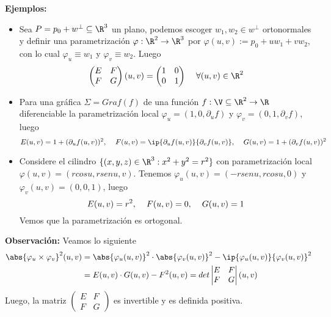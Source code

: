 \documentclass{article}
\begin{document}
\vspace{4mm}
\noindent\textbf{Ejemplos:}
\begin{itemize}
    \item Sea $P=p_{0}+w^{\perp}\subseteq\R^{3}$ un plano, podemos escoger $w_{1},w_{2}\in 
    w^{\perp}$ ortonormales y definir una parametrización $\varphi:\R^{2}\to\R^{3}$ por
    $\varphi(u,v):=p_{0}+uw_{1}+vw_{2}$, con lo cual $\varphi_{u}\equiv w_{1}$ y 
    $\varphi_{v}\equiv w_{2}$. Luego
    \begin{equation*}
        \begin{pmatrix}
            E & F \\
            F & G
        \end{pmatrix}(u,v)=
        \begin{pmatrix}
            1 & 0 \\
            0 & 1
        \end{pmatrix}\hspace{4mm}\forall(u,v)\in\R^{2}
    \end{equation*}

    \item Para una gráfica $\Sigma=Graf(f)$ de una función $f:\V\subseteq\R^{2}\to\R$ diferenciable
    la parametrización local $\varphi_{u}=(1,0,\partial_{u}f)$ y $\varphi_{v}=(0,1,\partial_{v}f)$,
    luego
    \begin{equation*}
        E(u,v)=1+(\partial_{u}f(u,v))^{2},\hspace{4mm}
        F(u,v)=\ip{\partial_{u}f(u,v)}{\partial_{v}f(u,v)},\hspace{4mm}
        G(u,v)=1+(\partial_{v}f(u,v))^{2}
    \end{equation*}

    \item Considere el cilindro $\{(x,y,z)\in\R^{3}:x^{2}+y^{2}=r^{2}\}$ con parametrización local
    $\varphi(u,v)=(rcosu,rsenu,v)$. Tenemos $\varphi_{u}(u,v)=(-rsenu,rcosu,0)$ y 
    $\varphi_{v}(u,v)=(0,0,1)$, luego
    \begin{equation*}
        E(u,v)=r^{2},\hspace{4mm}
        F(u,v)=0,\hspace{4mm}
        G(u,v)=1
    \end{equation*}
    Vemos que la parametrización es ortogonal.
\end{itemize}

\vspace{2mm}
\noindent\textbf{Observación:} Veamos lo siguiente
\begin{align*}
    \abs{\varphi_{u}\times\varphi_{v}}^{2}(u,v) &= \abs{\varphi_{u}(u,v)}^{2}\cdot
    \abs{\varphi_{v}(u,v)}^{2}-\ip{\varphi_{u}(u,v)}{\varphi_{v}(u,v)}^{2} \\
    &= E(u,v)\cdot G(u,v)-F^{2}(u,v)=det
    \begin{vmatrix}
        E & F \\
        F & G
    \end{vmatrix}(u,v)
\end{align*}
Luego, la matriz $\begin{pmatrix}
    E & F \\
    F & G
\end{pmatrix}$ es invertible y es definida positiva.
\end{document}

